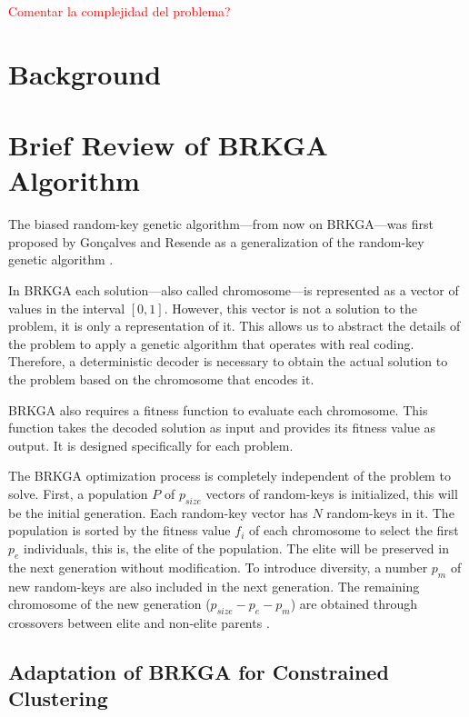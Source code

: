 \documentclass[review]{elsarticle}
\begin{document}
\textcolor{red}{Comentar la complejidad del problema?}

\section{Background}

\section{Brief Review of BRKGA Algorithm}

The biased random-key genetic algorithm---from now on BRKGA---was first proposed by Gonçalves and Resende \cite{gonccalves2011biased} as a generalization of the random-key genetic algorithm \cite{bean1994genetic}.

In BRKGA each solution---also called chromosome---is represented as a vector of values in the interval $[0,1]$. However, this vector is not a solution to the problem, it is only a representation of it. This allows us to abstract the details of the problem to apply a genetic algorithm that operates with real coding. Therefore, a deterministic decoder is necessary to obtain the actual solution to the problem based on the chromosome that encodes it. 

BRKGA also requires a fitness function to evaluate each chromosome. This function takes the decoded solution as input and provides its fitness value as output. It is designed specifically for each problem.

The BRKGA optimization process is completely independent of the problem to solve. First, a population $P$ of $p_{size}$ vectors of random-keys is initialized, this will be the initial generation. Each random-key vector has $N$ random-keys in it. The population is sorted by the fitness value $f_i$ of each chromosome to select the first $p_e$ individuals, this is, the elite of the population. The elite will be preserved in the next generation without modification. To introduce diversity, a number $p_m$ of new random-keys are also included in the next generation. The remaining chromosome of the new generation ($p_{size} - p_e - p_m$) are obtained through crossovers between elite and non-elite parents \cite{de2017comparison}.

\subsection{Adaptation of BRKGA for Constrained Clustering} \label{sec:AdaptationofBRKGA}
\end{document}
